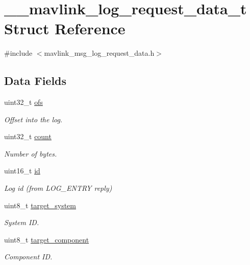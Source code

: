 \hypertarget{struct____mavlink__log__request__data__t}{\section{\+\_\+\+\_\+mavlink\+\_\+log\+\_\+request\+\_\+data\+\_\+t Struct Reference}
\label{struct____mavlink__log__request__data__t}
}


{\ttfamily \#include $<$mavlink\+\_\+msg\+\_\+log\+\_\+request\+\_\+data.\+h$>$}

\subsection*{Data Fields}
\begin{DoxyCompactItemize}
\item 
uint32\+\_\+t \hyperlink{struct____mavlink__log__request__data__t_a05e11a328deb8bf97856e613f23ad732}{ofs}
\begin{DoxyCompactList}\small\item\em Offset into the log. \end{DoxyCompactList}\item 
uint32\+\_\+t \hyperlink{struct____mavlink__log__request__data__t_addf7b7d415e01b0d04bfd774703b1e67}{count}
\begin{DoxyCompactList}\small\item\em Number of bytes. \end{DoxyCompactList}\item 
uint16\+\_\+t \hyperlink{struct____mavlink__log__request__data__t_a097a2a1603080846c44d0f6d8addd365}{id}
\begin{DoxyCompactList}\small\item\em Log id (from L\+O\+G\+\_\+\+E\+N\+T\+R\+Y reply) \end{DoxyCompactList}\item 
uint8\+\_\+t \hyperlink{struct____mavlink__log__request__data__t_aa9980b037a382ce22d5aafba5138dee3}{target\+\_\+system}
\begin{DoxyCompactList}\small\item\em System I\+D. \end{DoxyCompactList}\item 
uint8\+\_\+t \hyperlink{struct____mavlink__log__request__data__t_a8545bbedbb775bf25f278ddbe3c8a876}{target\+\_\+component}
\begin{DoxyCompactList}\small\item\em Component I\+D. \end{DoxyCompactList}\end{DoxyCompactItemize}


